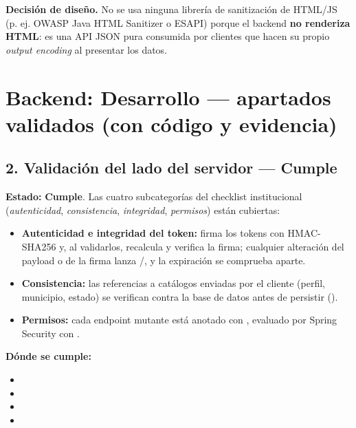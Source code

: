\documentclass[11pt,a4paper]{article}
\newcommand{\Cumple}{\textcolor{cumpleColor}{\textbf{Cumple}}}
\begin{document}
\noindent\textbf{Decisión de diseño.} No se usa ninguna librería de sanitización de HTML/JS (p. ej. OWASP Java HTML Sanitizer o ESAPI) porque el backend \textbf{no renderiza HTML}: es una API JSON pura consumida por clientes que hacen su propio \emph{output encoding} al presentar los datos.

\section{Backend: Desarrollo --- apartados validados (con código y evidencia)}

\subsection{2. Validación del lado del servidor --- \Cumple}

\textbf{Estado:} \Cumple. Las cuatro subcategorías del checklist institucional (\emph{autenticidad}, \emph{consistencia}, \emph{integridad}, \emph{permisos}) están cubiertas:

\begin{itemize}[leftmargin=1.2cm]
    \item \textbf{Autenticidad e integridad del token:} \texttt{} firma los tokens con HMAC-SHA256 y, al validarlos, \texttt{} recalcula y verifica la firma; cualquier alteración del payload o de la firma lanza \texttt{}/\texttt{}, y la expiración se comprueba aparte.
    \item \textbf{Consistencia:} las referencias a catálogos enviadas por el cliente (perfil, municipio, estado) se verifican contra la base de datos antes de persistir (\texttt{}).
    \item \textbf{Permisos:} cada endpoint mutante está anotado con \texttt{}, evaluado por Spring Security con \texttt{}.
\end{itemize}

\textbf{Dónde se cumple:}
\begin{itemize}[leftmargin=1.2cm,nosep]
\item \texttt{}
\item \texttt{}
\item \texttt{}
\item \texttt{}
\end{itemize}
\end{document}
